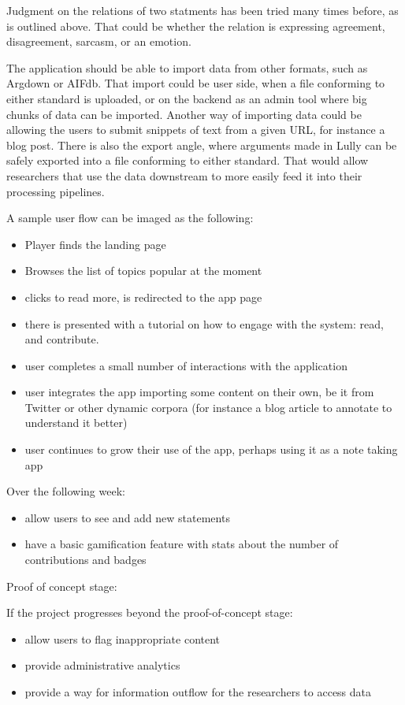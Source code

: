 \documentclass{report}
\begin{document}
Judgment on the relations of two statments has been tried many times before, as is outlined above. That could be whether the relation is expressing agreement, disagreement, sarcasm, or an emotion.

The application should be able to import data from other formats, such as Argdown or AIFdb. That import could be user side, when a file conforming to either standard is uploaded, or on the backend as an admin tool where big chunks of data can be imported.
Another way of importing data could be allowing the users to submit snippets of text from a given URL, for instance a blog post.
There is also the export angle, where arguments made in Lully can be safely exported into a file conforming to either standard. That would allow researchers that use the data downstream to more easily feed it into their processing pipelines.

A sample user flow can be imaged as the following:
\begin{itemize}
  \item Player finds the landing page
  \item Browses the list of topics popular at the moment
  \item clicks to read more, is redirected to the app page
  \item there is presented with a tutorial on how to engage with the system: read, and contribute.
\end{itemize}

\begin{itemize}
  \item user completes a small number of interactions with the application
  \item user integrates the app importing some content on their own, be it from Twitter or other dynamic corpora (for instance a blog article to annotate to understand it better)
  \item user continues to grow their use of the app, perhaps using it as a note taking app
\end{itemize}

Over the following week:
\begin{itemize}
  \item allow users to see and add new statements
  \item have a basic gamification feature with stats about the number of contributions and badges
\end{itemize}
Proof of concept stage:

If the project progresses beyond the proof-of-concept stage:
\begin{itemize}
  \item allow users to flag inappropriate content
  \item provide administrative analytics 
  \item provide a way for information outflow for the researchers to access data
\end{itemize}
\end{document}

